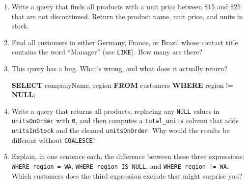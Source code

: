 \documentclass[
  letterpaper,
  DIV=11,
  numbers=noendperiod]{scrreprt}
\newenvironment{Shaded}{\begin{snugshade}}{\end{snugshade}}
\newcommand{\KeywordTok}[1]{\textcolor[rgb]{0.00,0.23,0.31}{\textbf{#1}}}
\newcommand{\NormalTok}[1]{\textcolor[rgb]{0.00,0.23,0.31}{#1}}
\newcommand{\OperatorTok}[1]{\textcolor[rgb]{0.37,0.37,0.37}{#1}}
\begin{document}
\begin{tcolorbox}[enhanced jigsaw, opacitybacktitle=0.6, arc=.35mm, colback=white, bottomtitle=1mm, opacityback=0, toprule=.15mm, left=2mm, colbacktitle=quarto-callout-note-color!10!white, breakable, coltitle=black, toptitle=1mm, colframe=quarto-callout-note-color-frame, bottomrule=.15mm, titlerule=0mm, title=\textcolor{quarto-callout-note-color}{\faInfo}\hspace{0.5em}{Exercises}, rightrule=.15mm, leftrule=.75mm]

\begin{enumerate}
\def\labelenumi{\arabic{enumi}.}
\item
  Write a query that finds all products with a unit price between \$15
  and \$25 that are not discontinued. Return the product name, unit
  price, and units in stock.
\item
  Find all customers in either Germany, France, or Brazil whose contact
  title contains the word ``Manager'' (use \texttt{LIKE}). How many are
  there?
\item
  This query has a bug. What's wrong, and what does it actually return?

  \begin{codelisting}

  \caption{\texttt{duckdb}}

\begin{Shaded}
\begin{Highlighting}[]
\KeywordTok{SELECT}\NormalTok{ companyName, region}
\KeywordTok{FROM}\NormalTok{ customers}
\KeywordTok{WHERE}\NormalTok{ region }\OperatorTok{!=} \KeywordTok{NULL}\NormalTok{;}
\end{Highlighting}
\end{Shaded}

  \end{codelisting}
\item
  Write a query that returns all products, replacing any \texttt{NULL}
  values in \texttt{unitsOnOrder} with \texttt{0}, and then computes a
  \texttt{total\_units} column that adds \texttt{unitsInStock} and the
  cleaned \texttt{unitsOnOrder}. Why would the results be different
  without \texttt{COALESCE}?
\item
  Explain, in one sentence each, the difference between these three
  expressions:
  \texttt{WHERE\ region\ =\ \textquotesingle{}WA\textquotesingle{}},
  \texttt{WHERE\ region\ IS\ NULL}, and
  \texttt{WHERE\ region\ !=\ \textquotesingle{}WA\textquotesingle{}}.
  Which customers does the third expression exclude that might surprise
  you?
\end{enumerate}

\end{tcolorbox}
\end{document}
